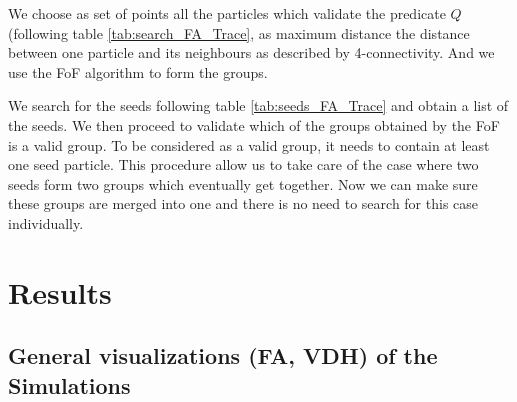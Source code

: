 \documentclass[12pt]{article}
\begin{document}
\begin{par}
We choose as set of points all the
particles which validate the predicate $Q$ (following table
\ref{tab:search_FA_Trace}, as maximum distance the distance
between one particle and its neighbours as described by
4-connectivity. And we use the FoF algorithm to form the groups. 
\end{par}
\begin{par}
We search for the seeds following table \ref{tab:seeds_FA_Trace}
and obtain a list of the seeds. We then proceed to validate which
of the groups obtained by the FoF is a valid group. To be
considered as a valid group, it needs to contain at least one seed
particle. This procedure allow us to take care of the case where
two seeds form two groups which eventually get together. Now we
can make sure these groups are merged into one and there is no
need to search for this case individually.
\end{par}


\section{Results}

\subsection{General visualizations (FA, VDH) of the Simulations}
\end{document}
